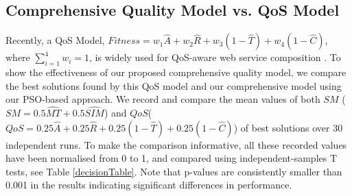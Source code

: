 \subsection{Comprehensive Quality Model vs. QoS Model}\label{comparisonTest}

Recently, a QoS Model, $Fitness = w_1 \hat{A} + w_2 \hat{R} + w_3(1 - \hat{T}) + w_4(1 - \hat{C})$, where $\sum_{i=1}^{4} w_i = 1$, is widely used for QoS-aware web service composition \cite{ma2015hybrid,da2016particle,da2015graphevol}. To show the effectiveness of our proposed comprehensive quality model, we compare the best solutions found by this QoS model and our comprehensive model using our PSO-based approach. We record and compare the mean values of both $SM$ ($SM = 0.5 \hat{MT} + 0.5 \hat{SIM}$) and $QoS$($QoS = 0.25 \hat{A} + 0.25 \hat{R} + 0.25(1 - \hat{T}) + 0.25(1 - \hat{C})$) of best solutions over 30 independent runs. To make the comparison informative, all these recorded values have been normalised from 0 to 1, and compared using independent-samples T tests, see Table \ref{decisionTable}. Note that p-values are consistently smaller than 0.001 in the results indicating significant differences in performance. 


